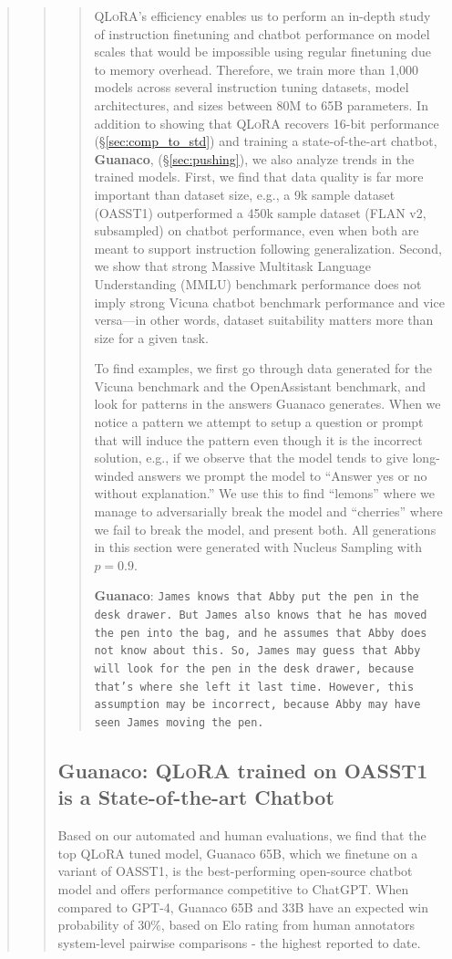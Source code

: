 \begin{quote}
\begin{quote}
\begin{quote}
\textsc{QLoRA}'s efficiency enables us to perform an in-depth study of instruction finetuning and chatbot performance on model scales that would be impossible using regular finetuning due to memory overhead. Therefore, we train more than 1,000 models across several instruction tuning datasets, model architectures, and sizes between 80M to 65B parameters. In addition to showing that \textsc{QLoRA} recovers 16-bit performance (\S\ref{sec:comp_to_std}) and training a state-of-the-art chatbot, \textbf{Guanaco}, (\S\ref{sec:pushing}), we also analyze trends in the trained models. First, we find that data quality is far more important than dataset size, e.g., a 9k sample dataset (OASST1) outperformed a 450k sample dataset (FLAN v2, subsampled) on chatbot performance, even when both are meant to support instruction following generalization. Second, we show that strong Massive Multitask Language Understanding (MMLU) benchmark performance does not imply strong Vicuna chatbot benchmark performance and vice versa—in other words, dataset suitability matters more than size for a given task. 

To find examples, we first go through data generated for the Vicuna benchmark and the OpenAssistant benchmark, and look for patterns in the answers {Guanaco} generates. When we notice a pattern we attempt to setup a question or prompt that will induce the pattern even though it is the incorrect solution, e.g., if we observe that the model tends to give long-winded answers we prompt the model to ``Answer yes or no without explanation.'' We use this to find ``lemons'' where we manage to adversarially break the model and ``cherries'' where we fail to break the model, and present both. All generations in this section were generated with Nucleus Sampling \cite{holtzmancurious} with $p=0.9$.

    \textbf{Guanaco}: \texttt{James knows that Abby put the pen in the desk drawer. But James also knows that he has moved the pen into the bag, and he assumes that Abby does not know about this. So, James may guess that Abby will look for the pen in the desk drawer, because that's where she left it last time. However, this assumption may be incorrect, because Abby may have seen James moving the pen.}
\end{quote}

\subsection{\textbf{Guanaco}: \textsc{QLoRA} trained on OASST1 is a State-of-the-art Chatbot} Based on our automated and human evaluations, we find that the top \textsc{QLoRA} tuned model, {Guanaco} 65B, which we finetune on a variant of OASST1, is the best-performing open-source chatbot model and offers performance competitive to ChatGPT. When compared to GPT-4, {Guanaco} 65B and 33B have an expected win probability of 30\%, based on Elo rating from human annotators system-level pairwise comparisons - the highest reported to date.


\end{quote}
\end{quote}
